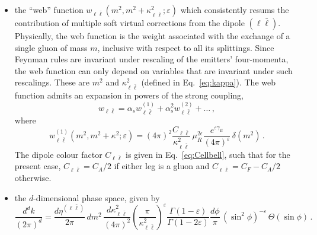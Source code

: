 \begin{itemize}
\item the ``web'' function
  $w_{\ell \bar \ell}(m^2,m^2+\kappa_{\ell\bar \ell}^2;\varepsilon)$
  which consistently resums the contribution of multiple soft virtual
  corrections from the dipole $(\ell\bar\ell)$. Physically, the web function is the weight associated
  with the exchange of a single gluon of mass $m$, inclusive with respect to
  all its splittings. Since Feynman rules are invariant under
  rescaling of the emitters' four-momenta, the web function can only
  depend on variables that are invariant under such rescalings. These
  are $m^2$ and $\kappa_{\ell\bar\ell}^2$ (defined in Eq.~\eqref{eq:kappa}).
  The web function admits an expansion in
  powers of the strong coupling,
  \begin{equation}
  w_{\ell \bar \ell} = \alpha_sw_{\ell \bar
    \ell}^{(1)}+\alpha_s^2w_{\ell \bar \ell}^{(2)}+\dots\,,
  \end{equation}
  where
  \begin{equation}
    \label{eq:w1}
    w_{\ell \bar \ell}^{(1)}(m^2,m^2+\kappa^2;\varepsilon) = (4\pi)^2\frac{C_{\ell\bar\ell}}{\kappa_{\ell\bar\ell}^2}\,\mu_R^{2\epsilon}\frac{e^{\varepsilon\gamma_E}}{(4\pi)^{\varepsilon}}\,\delta(m^2)\,.
  \end{equation}
The dipole colour factor $C_{\ell\bar \ell}$ is given in Eq.~\eqref{eq:Cellbell}, such that for the present case, $C_{\ell\bar \ell}=C_A/2$ if either leg is a gluon and $C_{\ell\bar \ell}=C_F-C_A/2$ otherwise.
\item the $d$-dimensional phase space, given by
  \begin{equation}
    \label{eq:dk}
    \frac{d^d k}{(2\pi)^d} = \frac{d\eta^{(\ell\bar \ell)}}{2\pi}\, dm^2 \,\frac{d\kappa^2_{\ell\bar \ell}}{(4\pi)^2}\left(\frac{\pi}{\kappa^2_{\ell\bar\ell}}\right)^\varepsilon\frac{\Gamma(1-\varepsilon)}{\Gamma(1-2\varepsilon)}\frac{d\phi}{\pi}\,(\sin^2\phi)^{-\varepsilon}\,\Theta(\sin\phi)\,. 
  \end{equation}
\end{itemize}

